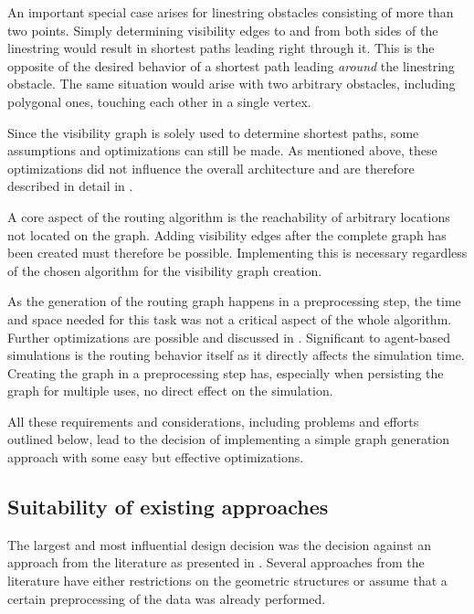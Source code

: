 		An important special case arises for linestring obstacles consisting of more than two points.
		Simply determining visibility edges to and from both sides of the linestring would result in shortest paths leading right through it.
		This is the opposite of the desired behavior of a shortest path leading \emph{around} the linestring obstacle.
		The same situation would arise with two arbitrary obstacles, including polygonal ones, touching each other in a single vertex.
		
		Since the visibility graph is solely used to determine shortest paths, some assumptions and optimizations can still be made.
		As mentioned above, these optimizations did not influence the overall architecture and are therefore described in detail in .
		
		A core aspect of the routing algorithm is the reachability of arbitrary locations not located on the graph.
		Adding visibility edges after the complete graph has been created must therefore be possible.
		Implementing this is necessary regardless of the chosen algorithm for the visibility graph creation.
		
		As the generation of the routing graph happens in a preprocessing step, the time and space needed for this task was not a critical aspect of the whole algorithm.
		Further optimizations are possible and discussed in .
		Significant to agent-based simulations is the routing behavior itself as it directly affects the simulation time.
		Creating the graph in a preprocessing step has, especially when persisting the graph for multiple uses, no direct effect on the simulation.
		
		All these requirements and considerations, including problems and efforts outlined below, lead to the decision of implementing a simple graph generation approach with some easy but effective optimizations.
	
	\subsection{Suitability of existing approaches}
	\label{subsec:suitablilty-edge-creation-approaches}

		The largest and most influential design decision was the decision against an approach from the literature as presented in .
		Several approaches from the literature have either restrictions on the geometric structures or assume that a certain preprocessing of the data was already performed.
		
